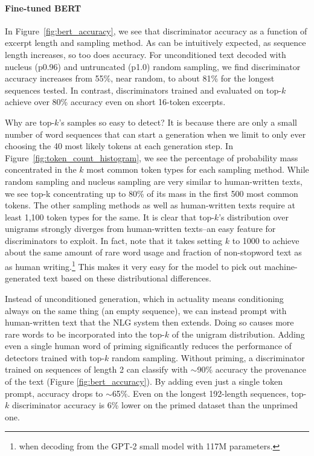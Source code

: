 \paragraph{Fine-tuned BERT} In Figure~\ref{fig:bert_accuracy}, we see that discriminator accuracy as a function of excerpt length and sampling method.
As can be intuitively expected, as sequence length increases, so too does accuracy.
For unconditioned text decoded with nucleus (p0.96) and untruncated (p1.0) random sampling, we find discriminator accuracy increases from 55\%, near random, to about 81\% for the longest sequences tested.
In contrast, discriminators trained and evaluated on top-$k$ achieve over 80\% accuracy even on short 16-token excerpts.

Why are top-$k$'s samples so easy to detect?
It is because there are only a small number of word sequences that can start a generation when we limit to only ever choosing the 40 most likely tokens at each generation step.
In Figure~\ref{fig:token_count_histogram}, we see the percentage of probability mass concentrated in the $k$ most common token types for each sampling method.
While random sampling and nucleus sampling are very similar to human-written texts, we see top-k concentrating up to 80\% of its mass in the first 500 most common tokens.
The other sampling methods as well as human-written texts require at least 1,100 token types for the same.
It is clear that top-$k$'s distribution over unigrams strongly diverges from human-written texts--an easy feature for discriminators to exploit.
In fact, \citet{see2019massively} note that it takes setting $k$ to 1000 to achieve about the same amount of rare word usage and fraction of non-stopword text as as human writing.\footnote{when decoding from the GPT-2 small model with 117M parameters.}
This makes it very easy for the model to pick out machine-generated text based on these distributional differences.

Instead of unconditioned generation, which in actuality means conditioning always on the same thing (an empty sequence), we can instead prompt with human-written text that the NLG system then extends.
Doing so causes more rare words to be incorporated into the top-$k$ of the unigram distribution.
Adding even a single human word of priming significantly reduces the performance of detectors trained with top-$k$ random sampling.
Without priming, a discriminator trained on sequences of length 2 can classify with $\mathtt{\sim}$90\% accuracy the provenance of the text (Figure \ref{fig:bert_accuracy}).
By adding even just a single token prompt, accuracy drops to $\mathtt{\sim}$65\%.
Even on the longest 192-length sequences, top-$k$ discriminator accuracy is 6\% lower on the primed dataset than the unprimed one.


